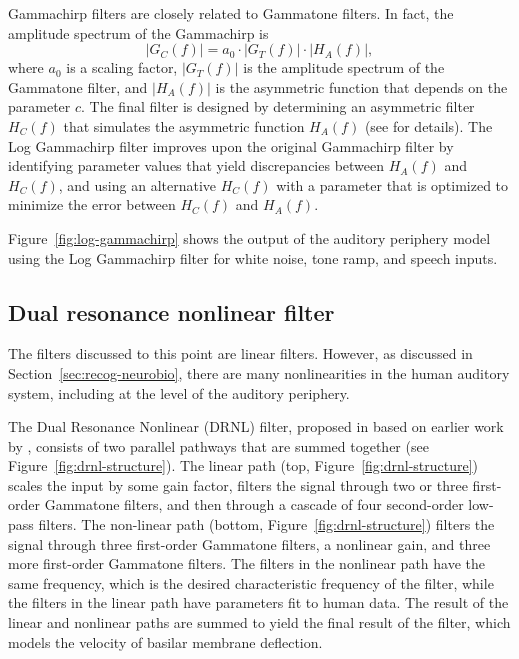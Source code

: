 Gammachirp filters are closely related
to Gammatone filters.
In fact, the amplitude spectrum of the Gammachirp is
\begin{equation*}
  |G_C(f)| = a_0 \cdot |G_T(f)| \cdot |H_A(f)|,
\end{equation*}
where $a_0$ is a scaling factor,
$|G_T(f)|$ is the amplitude spectrum
of the Gammatone filter,
and $|H_A(f)|$ is the asymmetric function
that depends on the parameter $c$.
The final filter
is designed by determining
an asymmetric filter $H_C(f)$
that simulates the
asymmetric function $H_A(f)$
(see \citealt{unoki2001} for details).
The Log Gammachirp filter improves upon
the original Gammachirp filter
by identifying parameter values
that yield discrepancies
between $H_A(f)$ and $H_C(f)$,
and using an alternative $H_C(f)$
with a parameter that is optimized
to minimize the error between
$H_C(f)$ and $H_A(f)$.

Figure~\ref{fig:log-gammachirp} shows the output
of the auditory periphery model
using the Log Gammachirp filter
for white noise, tone ramp, and speech inputs.


\subsection{Dual resonance nonlinear filter}

The filters discussed to this point
are linear filters.
However, as discussed in
Section~\ref{sec:recog-neurobio},
there are many nonlinearities
in the human auditory system,
including at the level of the auditory periphery.

The Dual Resonance Nonlinear (DRNL) filter,
proposed in \citet{lopez2001}
based on earlier work by \citet{meddis2001},
consists of two parallel pathways
that are summed together
(see Figure~\ref{fig:drnl-structure}).
The linear path (top, Figure~\ref{fig:drnl-structure})
scales the input by some gain factor,
filters the signal through
two or three first-order Gammatone filters,
and then through a cascade of
four second-order low-pass filters.
The non-linear path (bottom, Figure~\ref{fig:drnl-structure})
filters the signal through
three first-order Gammatone filters,
a nonlinear gain,
and three more first-order Gammatone filters.
The filters in the nonlinear path
have the same frequency,
which is the desired characteristic frequency
of the filter,
while the filters in the linear path
have parameters fit to human data.
The result of the linear and nonlinear paths
are summed to yield
the final result of the filter,
which models the velocity of
basilar membrane deflection.

